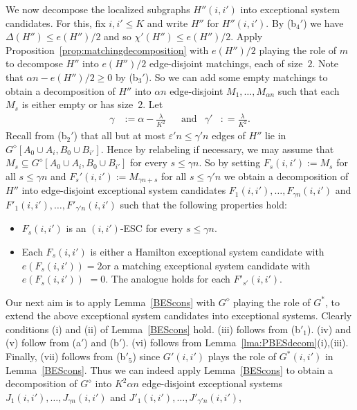 \documentclass{memo-l}
\def\eps{\varepsilon}
\numberwithin{section}{chapter}
\numberwithin{equation}{section}
\numberwithin{firstthm}{section}
\numberwithin{figure}{section}
\begin{document}
{We now decompose the localized subgraphs $H''(i,i')$ into exceptional system candidates. For this, 
fix $i,i' \le K$ and write $H''$ for $H''(i,i')$. By (b$_4'$) we have $\Delta(H'') \le e ( H'')/2$ and so $\chi'(H'') \le e ( H'')/2$.
Apply Proposition~\ref{prop:matchingdecomposition} with $e ( H'')/2$ playing the role of $m$ to decompose $H''$ into $e ( H'')/2$ edge-disjoint
matchings, each of size~$2$. Note that $\alpha n-e ( H'')/2\ge 0$ by (b$_3'$). So we can add some empty matchings to obtain a
decomposition of $H''$ into $\alpha n$ edge-disjoint $M_1, \dots ,M_{\alpha n}$ such that each $M_s$ is either empty or has size~2.
Let
\begin{align*}
\gamma & := \alpha - \frac{\lambda}{K^2} & 
& \text{and} &
\gamma' & : = \frac{\lambda}{K^2}.
\end{align*} 
Recall from (b$_2'$) that all but at most $\eps' n \le \gamma' n$ edges of $H''$ lie in $G^{\diamond}[A_0 \cup A_i, B_0 \cup B_{i'}]$.
Hence by relabeling if necessary, we may assume that  $M_s \subseteq G^{\diamond}[A_0 \cup A_i ,  B_0 \cup B_{i'}]$ for every $s \le \gamma n$.
So by setting $F_s(i,i') := M_s$ for all $s \le \gamma n$ and $F_s'(i,i') := M_{ \gamma n + s }$ for all $s \le \gamma' n$
we obtain a decomposition of $H''$ into edge-disjoint exceptional system candidates $F_1(i,i'), \dots , F_{\gamma n}(i,i')$
and $ F'_1(i,i'), \dots , F'_{\gamma ' n}(i,i')$ such that
the following properties hold:
\begin{itemize}
	\item[(a$'$)] $F_s(i,i')$ is an $(i,i')$-ESC for every $s \le \gamma n$.
	\item[(b$'$)] Each $F_s(i,i')$ is either a Hamilton exceptional system candidate with $e(F_s(i,i')) = 2$or a matching exceptional system candidate with $e(F_s(i,i'))$  $= 0$. The analogue holds for each $F'_{s'}(i,i')$.
\end{itemize}
Our next aim is to apply Lemma~\ref{BEScons} with $G^\diamond$ playing the role of $G^*$, to extend the above 
exceptional system candidates into exceptional systems.
Clearly conditions (i) and (ii) of Lemma~\ref{BEScons} hold. (iii) follows from (b$'_1$). (iv) and (v) follow from (a$'$) and (b$'$).
(vi) follows from Lemma~\ref{lma:PBESdecom}(i),(iii). Finally, (vii) follows from (b$'_5$) since $G'(i,i')$ plays the role of $G^*(i,i')$ in Lemma~\ref{BEScons}.
Thus we can indeed apply Lemma~\ref{BEScons} to obtain a decomposition of $G^\diamond$ into $K^2\alpha n$
edge-disjoint exceptional systems $J_1(i,i'),\dots,J_{\gamma n}(i,i')$ and $J'_1(i,i'),\dots,J'_{\gamma' n}(i,i')$,
}
\end{document}

